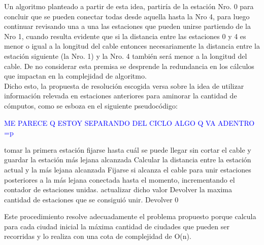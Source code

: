 Un algoritmo planteado a partir de esta idea, partiría de la estación Nro. 0 para concluir que se pueden conectar todas desde aquella hasta la Nro 4, para luego continuar revisando una a una las estaciones que pueden unirse partiendo de la Nro 1, cuando resulta evidente que si la distancia entre las estaciones  0 y 4 es menor o igual a la longitud del cable entonces necesariamente la distancia entre la estación siguiente (la Nro. 1) y la Nro. 4 también será menor a la longitud del cable. De no considerar esta premisa se desprende la redundancia en los cálculos que impactan en la complejidad de algoritmo. \\
 
Dicho esto, la propuesta de resolución escogida versa sobre la idea de utilizar información relevada en estaciones anteriores para aminorar la cantidad de cómputos, como se esboza en el siguiente pseudocódigo:

\textcolor{blue}{ME PARECE Q ESTOY SEPARANDO DEL CICLO ALGO Q VA ADENTRO =p}
\begin{algorithmic}

    \STATE tomar la primera estación
    \STATE fijarse hasta cuál se puede llegar sin cortar el cable y guardar la estación más lejana alcanzada
	\STATE Calcular la distancia entre la estación actual y la más lejana alcanzada
		 \STATE Fijarse si alcanza el cable para unir estaciones posteriores a la más lejana conectada hasta el momento, incrementando el contador de estaciones unidas.
	\ENDIF
		\STATE actualizar dicho valor
	\ENDIF
   \ENDWHILE
   \STATE Devolver la maxima cantidad de estaciones que se consiguió unir.
  \ELSE
    \STATE Devolver 0
  \ENDIF
\end{algorithmic}

Este procedimiento resolve adecuadamente el problema propuesto porque calcula para cada ciudad inicial la máxima cantidad de ciudades que pueden ser recorridas y lo realiza con una cota de complejidad de O(n).\\


%
%
%
%


